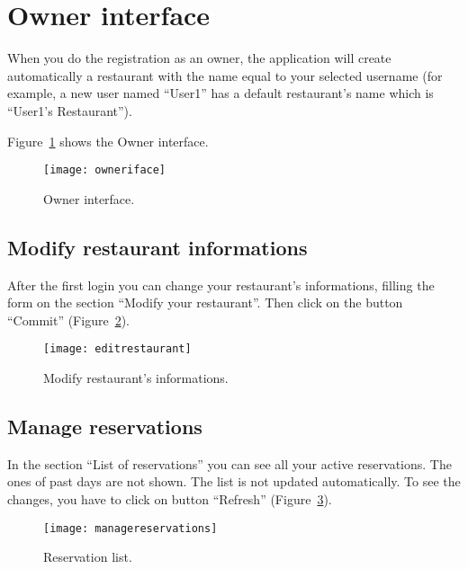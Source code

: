 \section{Owner interface}

When you do the registration as an owner, the application will create
automatically a restaurant with the name equal to your selected username (for
example, a new user named ``User1'' has a default restaurant’s name which is
``User1’s Restaurant'').

Figure~\ref{fig:owneriface} shows the Owner interface.

\begin{figure}[!ht]
	\texttt{[image: owneriface]}
	\caption{Owner interface.}
	\label{fig:owneriface}
\end{figure}

\subsection{Modify restaurant informations}

After the first login you can change your restaurant’s informations, filling the
form on the section ``Modify your restaurant''. Then click on the button
``Commit'' (Figure~\ref{fig:editrestaurant}).

\begin{figure}[!ht]
	\texttt{[image: editrestaurant]}
	\caption{Modify restaurant's informations.}
	\label{fig:editrestaurant}
\end{figure}

\subsection{Manage reservations} 

In the section ``List of reservations'' you can see all your active
reservations.  The ones of past days are not shown. The list is not updated
automatically. To see the changes, you have to click on button ``Refresh''
(Figure~\ref{fig:managereservations}).

\begin{figure}[!ht]
	\texttt{[image: managereservations]}
	\caption{Reservation list.}
	\label{fig:managereservations}
\end{figure}
